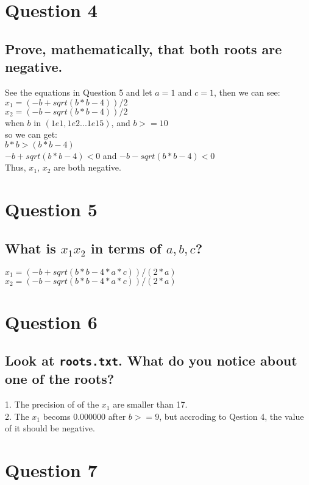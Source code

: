 \documentclass{article}
\begin{document}
\section*{Question 4}
\subsection*{Prove, mathematically, that both roots are negative.}

See the equations in Question 5 and let $a=1$ and $c=1$, then we can see:\\
$x_1 = ( -b + sqrt(b*b - 4) ) / 2$\\
$x_2 = ( -b - sqrt(b*b - 4) ) / 2$\\
when $b$ in $(1e1, 1e2... 1e15)$, and $b>=10$\\
so we can get:\\
$b*b>(b*b -4)$\\
$-b + sqrt(b*b - 4)<0$ and $-b - sqrt(b*b - 4)<0$\\
Thus, $x_1$, $x_2$ are both negative.

\section*{Question 5}
\subsection*{What is $x_1 x_2$ in terms of $a, b, c$?}

$x_1 = ( -b + sqrt(b*b - 4*a*c) ) / (2*a)$\\
$x_2 = ( -b - sqrt(b*b - 4*a*c) ) / (2*a)$

\section*{Question 6}
\subsection*{Look at \texttt{roots.txt}.  What do you notice about one of the
             roots?}

1. The precision of  of the $x_1$ are  smaller than 17.\\
2. The $x_1$ becoms 0.000000 after $b>=9$, but accroding to Qestion 4, the value of it should be negative.

\section*{Question 7}
\end{document}
